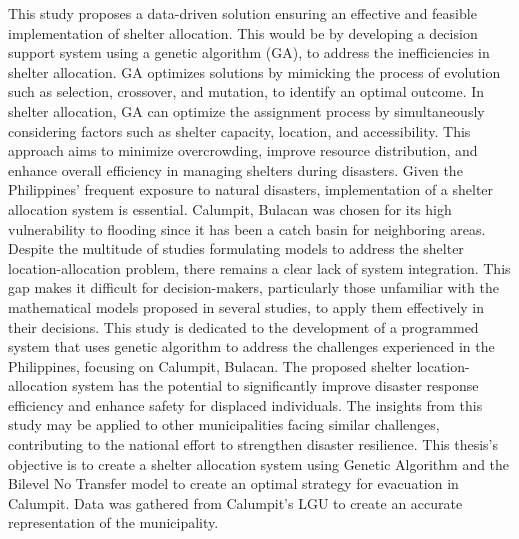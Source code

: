 \documentclass[12pt,a4paper,]{article}
\begin{document}
	This study proposes a data-driven solution ensuring an effective and feasible implementation of shelter allocation. This would be by developing a decision support system using a genetic algorithm (GA), to address the inefficiencies in shelter allocation. GA optimizes solutions by mimicking the process of evolution such as selection, crossover, and mutation, to identify an optimal outcome. In shelter allocation, GA can optimize the assignment process by simultaneously considering factors such as shelter capacity, location, and accessibility. This approach aims to minimize overcrowding, improve resource distribution, and enhance overall efficiency in managing shelters during disasters.
	Given the Philippines’ frequent exposure to natural disasters, implementation of a shelter allocation system is essential. Calumpit, Bulacan was chosen for its high vulnerability to flooding since it has been a catch basin for neighboring areas. Despite the multitude of studies formulating models to address the shelter location-allocation problem, there remains a clear lack of system integration. This gap makes it difficult for decision-makers, particularly those unfamiliar with the mathematical models proposed in several studies, to apply them effectively in their decisions. This study is dedicated to the development of a programmed system that uses genetic algorithm to address the challenges experienced in the Philippines, focusing on Calumpit, Bulacan. The proposed shelter location-allocation system has the potential to significantly improve disaster response efficiency and enhance safety for displaced individuals. The insights from this study may be applied to other municipalities facing similar challenges, contributing to the national effort to strengthen disaster resilience.
	This thesis’s objective is to create a shelter allocation system using Genetic Algorithm and the Bilevel No Transfer model to create an optimal strategy for evacuation in Calumpit. Data was gathered from Calumpit’s LGU to create an accurate representation of the municipality.
\end{document}

